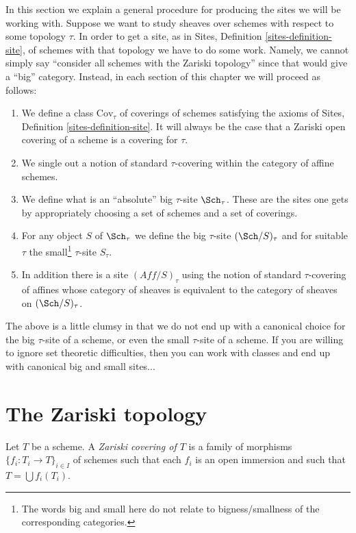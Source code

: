 \noindent
In this section we explain a general procedure for producing the
sites we will be working with. Suppose we want to study sheaves
over schemes with respect to some topology $\tau$. In order to
get a site, as in Sites, Definition \ref{sites-definition-site},
of schemes with that topology we have to do some work. Namely,
we cannot simply say ``consider all schemes with the Zariski topology''
since that would give a ``big'' category. Instead, in each section of
this chapter we will proceed as follows:
\begin{enumerate}
\item We define a class $\text{Cov}_\tau$ of coverings of schemes
satisfying the axioms of Sites, Definition \ref{sites-definition-site}.
It will always be the case that a Zariski open covering of
a scheme is a covering for $\tau$.
\item We single out a notion of standard
$\tau$-covering within the category of affine schemes.
\item We define what is an ``absolute'' big $\tau$-site $\Sch_\tau$.
These are the sites one gets by appropriately choosing a set of schemes
and a set of coverings.
\item For any object $S$ of $\Sch_\tau$
we define the big $\tau$-site $(\Sch/S)_\tau$ and for suitable
$\tau$ the small\footnote{The words big and
small here do not relate to bigness/smallness of the corresponding
categories.} $\tau$-site $S_\tau$.
\item In addition there is a site $(\textit{Aff}/S)_\tau$ using the
notion of standard $\tau$-covering of affines whose category of sheaves
is equivalent to the category of sheaves on $(\Sch/S)_\tau$.
\end{enumerate}
The above is a little clumsy in that we do not end up with a canonical
choice for the big $\tau$-site of a scheme, or even the small
$\tau$-site of a scheme. If you are willing to ignore set theoretic
difficulties, then you can work with classes and end up with
canonical big and small sites...







\section{The Zariski topology}
\label{section-zariski}

\begin{definition}
\label{definition-zariski-covering}
Let $T$ be a scheme. A {\it Zariski covering of $T$} is a family
of morphisms $\{f_i : T_i \to T\}_{i \in I}$ of schemes
such that each $f_i$ is an open immersion and such
that $T = \bigcup f_i(T_i)$.
\end{definition}

